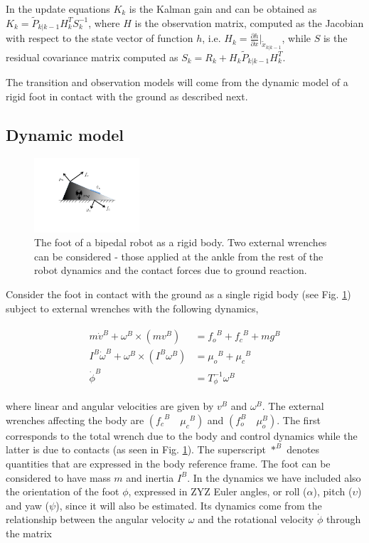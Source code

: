 \documentclass[letterpaper, 10 pt, conference]{ieeeconf}  %
\begin{document}
In the update equations $K_k$ is the Kalman gain and can be obtained as $K_k = \tilde{P}_{k|k-1} H^T_k S^{-1}_k$, where $H$ is the observation matrix, computed as the Jacobian with respect to the state vector of function $h$, i.e. $H_k = \frac{\partial h}{\partial x} \rvert_{\tilde{x}_{k|k-1}}$, while $S$ is the residual covariance matrix computed as $S_k = R_k + H_k \tilde{P}_{k|k-1} H^T_k$.

The transition and observation models will come from the dynamic model of a rigid foot in contact with the ground as described next.

\subsection{Dynamic model}

\begin{figure}[htb]  
  \centering
    \includegraphics[width=0.35\textwidth]{./figs/foot.pdf}
    \caption{The foot of a bipedal robot as a rigid body. Two external wrenches can be considered - those applied at the ankle from the rest of the robot dynamics and the contact forces due to ground reaction.}
    \label{fig:foot_rigid_body}
\end{figure}

Consider the foot in contact with the ground as a single rigid body (see Fig. \ref{fig:foot_rigid_body}) subject to external wrenches with the following dynamics,

\begin{align}
 \begin{split}
  m \dot{v}^B + \omega^B \times (mv^B)              &= {f_o}^B + {f_c}^B + mg^B \\
  I^B\dot{\omega}^B + \omega^B \times (I^B\omega^B) &= {\mu_o}^B + {\mu_c}^B\\
  \dot{\phi}^B &= T_{\phi}^{-1} \omega^B
 \end{split}
\label{eq:dynamics}
\end{align}

where linear and angular velocities are given by $v^B$ and $\omega^B$. The external wrenches affecting the body are $({f_c}^B \quad {\mu_c}^B)$ and $(f_o^B \quad \mu_o^B)$. The first corresponds to the total wrench due to the body and control dynamics while the latter is due to contacts (as seen in Fig. \ref{fig:foot_rigid_body}). The superscript $*^B$ denotes quantities that are expressed in the body reference frame. The foot can be considered to have mass $m$ and inertia $I^B$. In the dynamics we have included also the orientation of the foot $\phi$, expressed in ZYZ Euler angles, or roll ($\alpha$), pitch ($\upsilon$) and yaw ($\psi$), since it will also be estimated. Its dynamics come from the relationship between the angular velocity $\omega$ and the rotational velocity $\dot{\phi}$ \cite{siciliano2009robotics} through the matrix 
\end{document}
